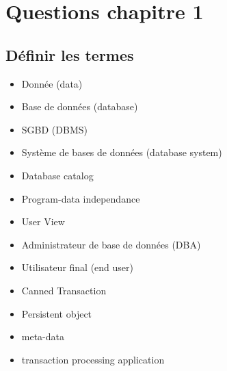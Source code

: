 \section{Questions chapitre 1}

\subsection{Définir les termes}

\begin{itemize}
	\item Donnée (data)
	\item Base de données (database)
	\item SGBD (DBMS)
	\item Système de bases de données (database system)
	\item Database catalog
	\item Program-data independance
	\item User View
	\item Administrateur de base de données (DBA)
	\item Utilisateur final (end user)
	\item Canned Transaction
	\item Persistent object
	\item meta-data
	\item transaction processing application
\end{itemize}

